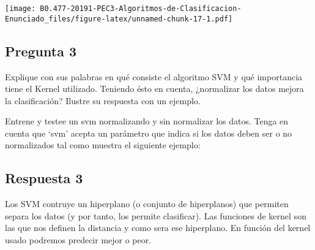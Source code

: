 \documentclass[]{article}
\newenvironment{Shaded}{\begin{snugshade}}{\end{snugshade}}
\newcommand{\KeywordTok}[1]{\textcolor[rgb]{0.94,0.87,0.69}{#1}}
\newcommand{\DataTypeTok}[1]{\textcolor[rgb]{0.87,0.87,0.75}{#1}}
\newcommand{\DecValTok}[1]{\textcolor[rgb]{0.86,0.86,0.80}{#1}}
\newcommand{\StringTok}[1]{\textcolor[rgb]{0.80,0.58,0.58}{#1}}
\newcommand{\CommentTok}[1]{\textcolor[rgb]{0.50,0.62,0.50}{#1}}
\newcommand{\OtherTok}[1]{\textcolor[rgb]{0.94,0.94,0.56}{#1}}
\newcommand{\OperatorTok}[1]{\textcolor[rgb]{0.94,0.94,0.82}{#1}}
\newcommand{\NormalTok}[1]{\textcolor[rgb]{0.80,0.80,0.80}{#1}}
\begin{document}
\texttt{[image: B0.477-20191-PEC3-Algoritmos-de-Clasificacion-Enunciado\_files/figure-latex/unnamed-chunk-17-1.pdf]}

\subsection{Pregunta 3}\label{pregunta-3}

Explique con sus palabras en qué consiste el algoritmo SVM y qué
importancia tiene el Kernel utilizado. Teniendo ésto en cuenta,
¿normalizar los datos mejora la clasificación? Ilustre su respuesta con
un ejemplo.

Entrene y testee un svm normalizando y sin normalizar los datos. Tenga
en cuenta que `svm' acepta un parámetro que indica si los datos deben
ser o no normalizados tal como muestra el siguiente ejemplo:

\begin{Shaded}
\end{Shaded}

\subsection{Respuesta 3}\label{respuesta-3}

Los SVM contruye un hiperplano (o conjunto de hiperplanos) que permiten
separa los datos (y por tanto, los permite clasificar). Las funciones de
kernel son las que nos definen la distancia y como sera ese hiperplano.
En función del kernel usado podremos predecir mejor o peor.

\begin{Shaded}
\end{Shaded}
\end{document}
